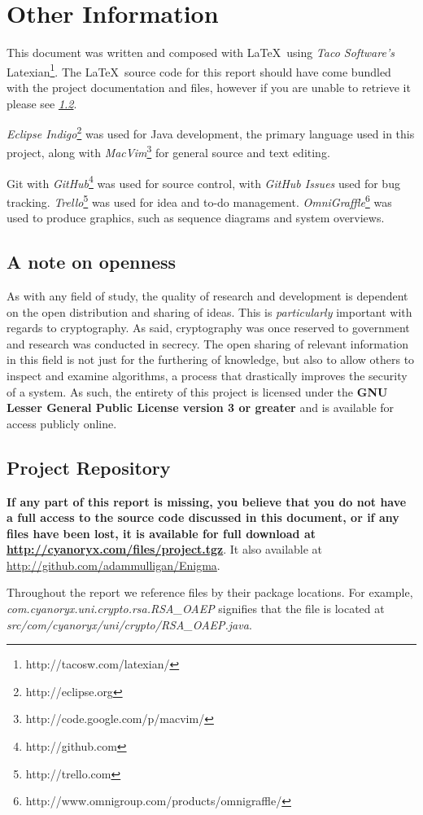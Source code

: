 \section{Other Information}

This document was written and composed with \LaTeX \ using \emph{Taco Software's} Latexian\footnote{http://tacosw.com/latexian/}. The \LaTeX \ source code for this report should have come bundled with the project documentation and files, however if you are unable to retrieve it please see \emph{\textsection \ref{sec:project_repo}}.

\emph{Eclipse Indigo}\footnote{http://eclipse.org} was used for Java development, the primary language used in this project, along with \emph{MacVim}\footnote{http://code.google.com/p/macvim/} for general source and text editing.

Git with \emph{GitHub}\footnote{http://github.com} was used for source control, with \emph{GitHub Issues} used for bug tracking. \emph{Trello}\footnote{http://trello.com} was used for idea and to-do management. \emph{OmniGraffle}\footnote{http://www.omnigroup.com/products/omnigraffle/} was used to produce graphics, such as sequence diagrams and system overviews.

\subsection{A note on openness}

As with any field of study, the quality of research and development is dependent on the open distribution and sharing of ideas. This is \emph{particularly} important with regards to cryptography. As said, cryptography was once reserved to government and research was conducted in secrecy. The open sharing of relevant information in this field is not just for the furthering of knowledge, but also to allow others to inspect and examine algorithms, a process that drastically improves the security of a system. As such, the entirety of this project is licensed under the \textbf{GNU Lesser General Public License version 3 or greater} and is available for access publicly online.

\subsection{Project Repository}
\label{sec:project_repo}

\textbf{If any part of this report is missing, you believe that you do not have a full access to the source code discussed in this document, or if any files have been lost, it is available for full download at \url{http://cyanoryx.com/files/project.tgz}}. It also available at \url{http://github.com/adammulligan/Enigma}.

Throughout the report we reference files by their package locations. For example, \emph{com.cyanoryx.uni.crypto.rsa.RSA\_OAEP} signifies that the file is located at \emph{src/com/cyanoryx/uni/crypto/RSA\_OAEP.java}.